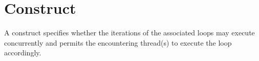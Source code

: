 %
%
%
%
%
%
%
%
%
%
%
%
%

\section{ Construct}
\label{sec:loop Construct}
\summary
  A  construct specifies whether the iterations of the associated
  loops may execute concurrently and permits the encountering thread(s) to
  execute the loop accordingly.

